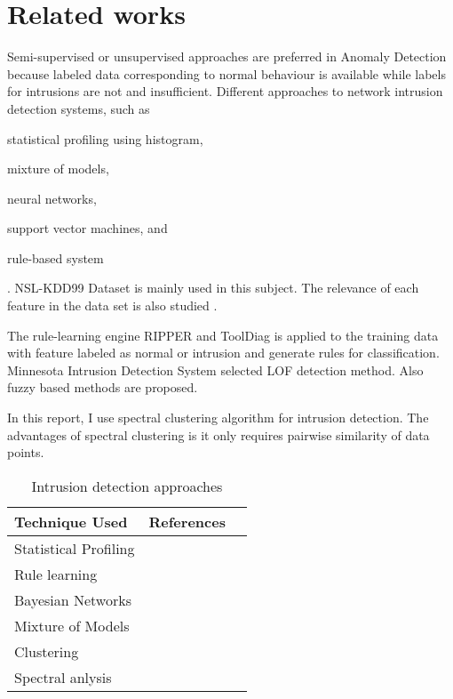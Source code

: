 \section{Related works}
Semi-supervised or unsupervised approaches are preferred in Anomaly Detection\cite{chandola09} because labeled data corresponding to normal behaviour is available while labels for intrusions are not and insufficient. 
Different approaches to network intrusion detection systems, such as \begin{inparaenum} \item statistical profiling using histogram, \item mixture of models, \item neural networks, \item support vector machines, and \item rule-based system\end{inparaenum}. NSL-KDD99 Dataset is mainly used in this subject\cite{tavallaee09}. 
The relevance of each feature in the data set is also studied\cite{olusola10} \cite{kayacik05}. 

The rule-learning engine RIPPER and ToolDiag is applied to the training data with feature labeled as normal or intrusion and generate rules for classification. 
Minnesota Intrusion Detection System selected LOF detection method. 
Also fuzzy based methods are proposed.


In this report, I use spectral clustering algorithm for intrusion detection. 
The advantages of spectral clustering is it only requires pairwise similarity of data points. 

\begin{table}[h]
\begin{center}
\begin{tabular}{| l | p{5cm} | p{5cm} |}
\hline
Technique Used & References \\
\hline
Statistical Profiling &   \\
\hline
Rule learning &   \\
\hline
Bayesian Networks &    \\
\hline
Mixture of Models &    \\
\hline
Clustering &    \\
\hline
Spectral anlysis &    \\
\hline
\end{tabular}
\end{center}
\caption{Intrusion detection approaches}
\label{fig:refSingleRobot1}
\end{table}

